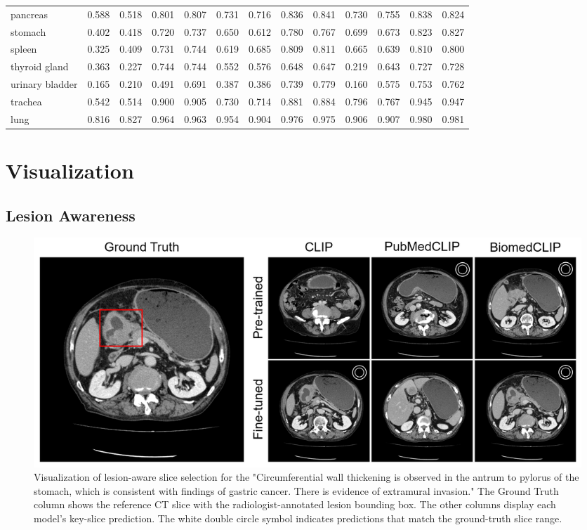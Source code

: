 \documentclass[bioengineering,article,submit,pdftex,moreauthors]{Definitions/mdpi}
\begin{document}
\begin{landscape}
\begin{table}[ht]
\begin{tabular}{l*{6}{cc}}
    pancreas          & 0.588 & 0.518 & 0.801 & 0.807 & 0.731 & 0.716 & 0.836 & 0.841 & 0.730 & 0.755 & 0.838 & 0.824  \\
    stomach           & 0.402 & 0.418 & 0.720 & 0.737 & 0.650 & 0.612 & 0.780 & 0.767 & 0.699 & 0.673 & 0.823 & 0.827  \\
    spleen            & 0.325 & 0.409 & 0.731 & 0.744 & 0.619 & 0.685 & 0.809 & 0.811 & 0.665 & 0.639 & 0.810 & 0.800  \\
    thyroid gland     & 0.363 & 0.227 & 0.744 & 0.744 & 0.552 & 0.576 & 0.648 & 0.647 & 0.219 & 0.643 & 0.727 & 0.728  \\
    urinary bladder   & 0.165 & 0.210 & 0.491 & 0.691 & 0.387 & 0.386 & 0.739 & 0.779 & 0.160 & 0.575 & 0.753 & 0.762  \\
    trachea           & 0.542 & 0.514 & 0.900 & 0.905 & 0.730 & 0.714 & 0.881 & 0.884 & 0.796 & 0.767 & 0.945 & 0.947  \\
    lung              & 0.816 & 0.827 & 0.964 & 0.963 & 0.954 & 0.904 & 0.976 & 0.975 & 0.906 & 0.907 & 0.980 & 0.981  \\
    \bottomrule
  \end{tabular}
\end{table}
\end{landscape}


\section{Visualization}\label{app:visualization}
\subsection{Lesion Awareness}

\begin{figure}[ht]
  \centering
  \includegraphics[width=1\textwidth]{./figures/app_lesion_aware_inst6_2.png}
  \caption{Visualization of lesion-aware slice selection for the "Circumferential wall thickening is observed in the antrum to pylorus of the stomach, which is consistent with findings of gastric cancer. 
  There is evidence of extramural invasion."
  The Ground Truth column shows the reference CT slice with the radiologist-annotated lesion bounding box.
  The other columns display each model’s key-slice prediction.
  The white double circle symbol indicates predictions that match the ground-truth slice range.}
  \label{fig:lesion_aware_inst6}
\end{figure}
\end{document}
